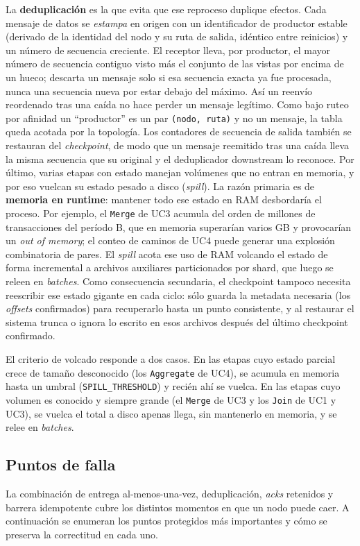 \documentclass[12pt,a4paper]{article}
\begin{document}
La \textbf{deduplicación} es la que evita que ese reproceso duplique
efectos. Cada mensaje de datos se \textit{estampa} en origen con un
identificador de productor estable (derivado de la identidad del nodo y
su ruta de salida, idéntico entre reinicios) y un número de secuencia
creciente. El receptor lleva, por productor, el mayor número de secuencia
contiguo visto más el conjunto de las vistas por encima de un hueco; descarta
un mensaje solo si esa secuencia exacta ya fue procesada, nunca una secuencia
nueva por estar debajo del máximo. Así un reenvío reordenado tras una caída no
hace perder un mensaje legítimo. Como bajo ruteo por afinidad un
``productor'' es un par
\texttt{(nodo, ruta)} y no un mensaje, la tabla queda acotada por la
topología. Los contadores de secuencia de salida también se restauran del
\textit{checkpoint}, de modo que un mensaje reemitido tras una caída lleva la
misma secuencia que su original y el deduplicador downstream lo reconoce.
Por último, varias etapas con estado manejan volúmenes que no entran en
memoria, y por eso vuelcan su estado pesado a disco (\textit{spill}). La razón
primaria es de \textbf{memoria en runtime}: mantener todo ese estado en RAM
desbordaría el proceso. Por ejemplo, el \texttt{Merge} de UC3 acumula del orden
de millones de transacciones del período B, que en memoria superarían varios GB
y provocarían un \textit{out of memory}; el conteo de caminos de UC4 puede
generar una explosión combinatoria de pares. El \textit{spill} acota ese uso de
RAM volcando el estado de forma incremental a archivos auxiliares particionados
por shard, que luego se releen en \textit{batches}. Como consecuencia
secundaria, el checkpoint tampoco necesita reescribir ese estado gigante en cada
ciclo: sólo guarda la metadata necesaria (los \textit{offsets} confirmados) para
recuperarlo hasta un punto consistente, y al restaurar el sistema trunca o
ignora lo escrito en esos archivos después del último checkpoint confirmado.

El criterio de volcado responde a dos casos. En las etapas cuyo estado parcial
crece de tamaño desconocido (los \texttt{Aggregate} de UC4), se acumula en
memoria hasta un umbral (\texttt{SPILL\_THRESHOLD}) y recién ahí se vuelca. En las
etapas cuyo volumen es conocido y siempre grande (el \texttt{Merge} de UC3 y los
\texttt{Join} de UC1 y UC3), se vuelca el total a disco apenas llega, sin
mantenerlo en memoria, y se relee en \textit{batches}.

\subsection{Puntos de falla}
La combinación de entrega al-menos-una-vez, deduplicación,
\textit{acks} retenidos y barrera idempotente cubre los distintos
momentos en que un nodo puede caer. A continuación se enumeran los
puntos protegidos más importantes y cómo se preserva la correctitud en cada uno.
\end{document}
